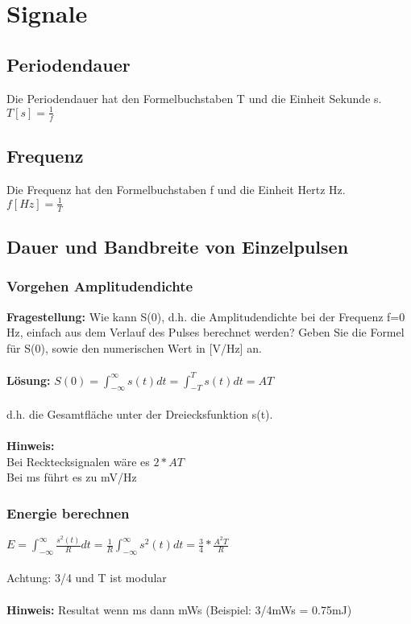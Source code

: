 
\section{Signale}


\subsection{Periodendauer}
Die Periodendauer hat den Formelbuchstaben T und die Einheit Sekunde s.\\
$T[s] = \frac{1}{f}$

\subsection{Frequenz}
Die Frequenz hat den Formelbuchstaben f und die Einheit Hertz Hz.\\
$f[Hz] = \frac{1}{T}$



\subsection{Dauer und Bandbreite von Einzelpulsen}
\subsubsection{Vorgehen Amplitudendichte}
\textbf{Fragestellung:} Wie kann S(0), d.h. die Amplitudendichte bei der Frequenz f=0 Hz, einfach aus dem Verlauf des Pulses berechnet werden? Geben Sie die Formel für S(0), sowie den numerischen Wert in [V/Hz] an.\\
\\
\textbf{Lösung:} $S(0)=\int_{-\infty }^{\infty}s(t)dt=\int_{-T}^{T}s(t)dt=AT$ \\
\\
d.h. die Gesamtfläche unter der Dreiecksfunktion s(t).\\
\\
\textbf{Hinweis:} \\
Bei Recktecksignalen wäre es $2*AT$\\
Bei ms führt es zu mV/Hz

\subsubsection{Energie berechnen}
$E=\int_{-\infty}^{\infty}\frac{s^2(t)}{R}dt=\frac{1}{R}\int_{-\infty}^{\infty}s^2(t)dt=\frac{3}{4}*\frac{A^2T}{R}$
\\
\\
Achtung: 3/4 und T ist modular \\
\\
\textbf{Hinweis:} Resultat wenn ms dann mWs (Beispiel: 3/4mWs = 0.75mJ)

